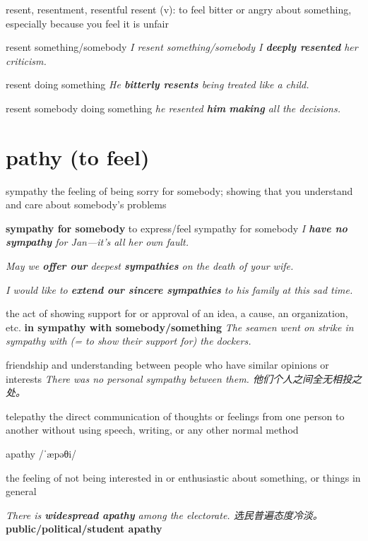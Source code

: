 \begin{RefWord}{resent, resentment, resentful}
    resent (v): to feel bitter or angry about something, especially because you feel it is unfair

    resent something/somebody
    \textit{I resent something/somebody I \textbf{deeply resented} her criticism.}

    resent doing something
    \textit{He \textbf{bitterly resents} being treated like a child.}

    resent somebody doing something
    \textit{he resented \textbf{him} \textbf{making} all the decisions.}
\end{RefWord}

\section{pathy (to feel)}

\begin{RefWord}{sympathy}
    the feeling of being sorry for somebody; showing that you understand and care about somebody's problems

    \textbf{sympathy for somebody} to express/feel sympathy for somebody
    \textit{I \textbf{have no sympathy} for Jan—it's all her own fault.}

    \textit{May we \textbf{offer our} deepest \textbf{sympathies} on the death of your wife.}

    \textit{ I would like to \textbf{extend our sincere sympathies} to his family at this sad time.}

    the act of showing support for or approval of an idea, a cause, an organization, etc.
    \textbf{in sympathy with somebody/something} 
    \textit{The seamen went on strike in sympathy with (= to show their support for) the dockers.}

    friendship and understanding between people who have similar opinions or interests
    \textit{There was no personal sympathy between them. 他们个人之间全无相投之处。}
\end{RefWord}

\begin{DefWord}{telepathy}
    the direct communication of thoughts or feelings from one person to another without using speech, writing, or any other normal method
\end{DefWord}

\begin{DefWord}{apathy}
    /ˈæpəθi/

    the feeling of not being interested in or enthusiastic about something, or things in general

    \textit{There is \textbf{widespread apathy} among the electorate. 选民普遍态度冷淡。}
    \textbf{public/political/student apathy}
\end{DefWord}

